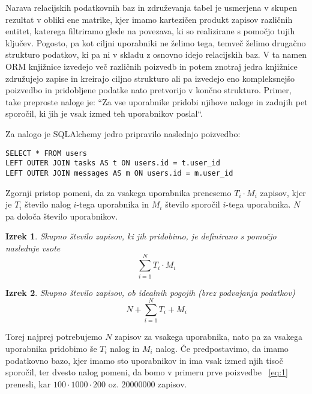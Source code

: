 \documentclass[a4paper,12pt,openright]{book}
\newtheorem{izrek}{Izrek}[chapter]
\begin{document}
    Narava relacijskih podatkovnih baz in združevanja tabel je usmerjena v skupen rezultat v obliki ene matrike, kjer imamo kartezičen produkt zapisov različnih entitet, katerega filtriramo glede na povezava, ki so realizirane s pomočjo tujih ključev. Pogosto, pa kot ciljni uporabniki ne želimo tega, temveč želimo drugačno strukturo podatkov, ki pa ni v skladu z osnovno idejo relacijskih baz. V ta namen ORM knjižnice izvedejo več različnih poizvedb in potem znotraj jedra knjižnice združujejo zapise in kreirajo ciljno strukturo ali pa izvedejo eno kompleksnejšo poizvedbo in pridobljene podatke nato pretvorijo v končno strukturo. Primer, take preproste naloge je: ``Za vse uporabnike pridobi njihove naloge in zadnjih pet sporočil, ki jih je vsak izmed teh uporabnikov poslal``.

    \noindent
    Za nalogo je SQLAlchemy jedro pripravilo naslednjo poizvedbo:
    \begin{verbatim}
SELECT * FROM users
LEFT OUTER JOIN tasks AS t ON users.id = t.user_id
LEFT OUTER JOIN messages AS m ON users.id = m.user_id
    \end{verbatim}

    \noindent
    Zgornji pristop pomeni, da za vsakega uporabnika prenesemo $T_i \cdot M_i$ zapisov, kjer je $T_i$ število nalog $i$-tega uporabnika in $M_i$ število sporočil $i$-tega uporabnika.
    $N$ pa določa število uporabnikov.

    \begin{izrek}
        \label{iz:1}
        Skupno število zapisov, ki jih pridobimo, je definirano s pomočjo naslednje vsote
        \begin{equation}
            \sum_{i=1}^{N} T_i \cdot M_i
        \label{eq:1}
        \end{equation}
    \end{izrek}

    \begin{izrek}
        \label{iz:2}
        Skupno število zapisov, ob idealnih pogojih (brez podvajanja podatkov)
        \begin{equation}
            N + \sum_{i=1}^{N} T_i + M_i
        \label{eq:2}
        \end{equation}
    \end{izrek}

    \noindent
    Torej najprej potrebujemo $N$ zapisov za vsakega uporabnika, nato pa za vsakega uporabnika pridobimo še $T_i$ nalog in $M_i$ nalog. Če predpostavimo, da imamo podatkovno bazo, kjer imamo sto uporabnikov in ima vsak izmed njih tisoč sporočil, ter dvesto nalog pomeni, da bomo v primeru prve poizvedbe ~\eqref{eq:1} prenesli, kar $100 \cdot 1000 \cdot 200$ oz. $\num{20000000}$ zapisov.
\end{document}
